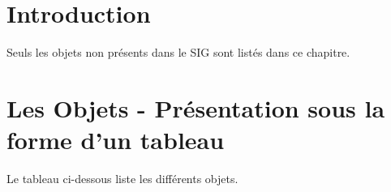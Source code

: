 \documentclass[12pt,titlepage]{book}
\begin{document}
\section{Introduction}
Seuls les objets non présents dans le SIG sont listés dans ce chapitre.


\section{Les Objets - Présentation sous la forme d'un tableau}
Le tableau ci-dessous liste les différents objets.
\vspace{\baselineskip}
\end{document}
